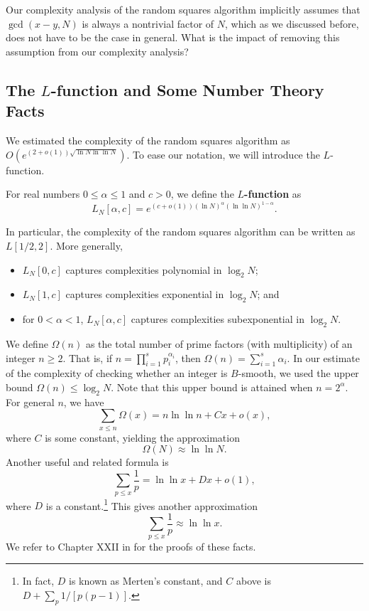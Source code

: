 \begin{exercise}
    Our complexity analysis of the random squares algorithm implicitly 
    assumes that $\gcd(x-y, N)$ is always a nontrivial factor of $N$, 
    which as we discussed before, does not have to be the case in general. 
    What is the impact of removing this assumption from our complexity analysis? 
\end{exercise}

\subsection{The $L$-function and Some Number Theory Facts}
We estimated the complexity of the random squares algorithm as 
$O(e^{(2+o(1))\sqrt{\ln N \ln\ln N}})$. To ease our notation, we will introduce 
the $L$-function. 

\begin{defn}
    For real numbers $0 \leq \alpha \leq 1$ and $c > 0$, we define the 
    {\bf $L$-function} as 
    \[ L_N[\alpha, c] = e^{(c+o(1))(\ln N)^{\alpha}(\ln\ln N)^{1-\alpha}}. \] 
\end{defn}

In particular, the complexity of the random squares algorithm can be written as 
$L[1/2, 2]$. More generally, 
\begin{itemize}
    \item $L_N[0, c]$ captures complexities polynomial in $\log_2 N$; 
    \item $L_N[1, c]$ captures complexities exponential in $\log_2 N$; and 
    \item for $0 < \alpha < 1$, $L_N[\alpha, c]$ captures complexities 
    subexponential in $\log_2 N$. 
\end{itemize}

We define $\Omega(n)$ as the total number of prime factors (with multiplicity) 
of an integer $n \geq 2$. That is, if $n = \prod_{i=1}^s p_i^{\alpha_i}$, then 
$\Omega(n) = \sum_{i=1}^s \alpha_i$. In our estimate of the complexity of 
checking whether an integer is $B$-smooth, we used the upper bound 
$\Omega(n) \leq \log_2 N$. Note that this upper bound is attained when 
$n = 2^{\alpha}$. For general $n$, we have 
\[ \sum_{x\leq n} \Omega(x) = n\ln\ln n + Cx + o(x), \] 
where $C$ is some constant, yielding the approximation 
\[ \Omega(N) \approx \ln\ln N. \tag{4.1} \] 
Another useful and related formula is 
\[ \sum_{p\leq x} \frac1p = \ln\ln x + Dx + o(1), \] 
where $D$ is a constant.\footnote[1]{In fact, $D$ is known as Merten's constant, and 
$C$ above is $D + \sum_p 1/[p(p-1)]$.} This gives another approximation 
\[ \sum_{p\leq x} \frac1p \approx \ln\ln x. \tag{4.2} \] 
We refer to Chapter XXII in \cite{bams/1183493592} for the proofs of these facts.

